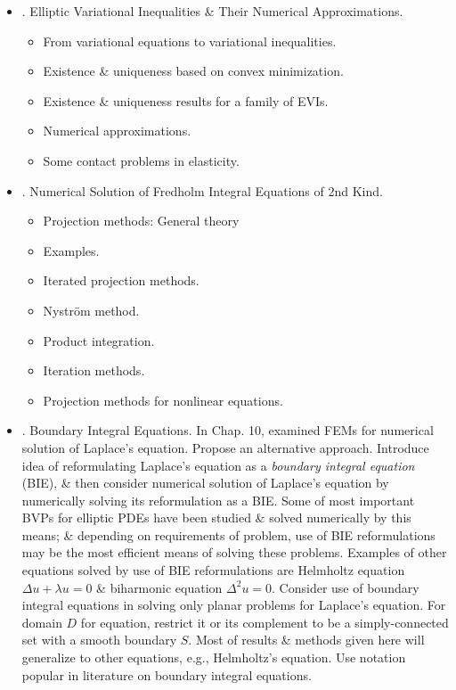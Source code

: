 \documentclass{article}
\begin{document}
\begin{enumerate}
\begin{itemize}
		\item {. Elliptic Variational Inequalities \& Their Numerical Approximations.}
		\begin{itemize}
			\item {\sf From variational equations to variational inequalities.}
			\item {\sf Existence \& uniqueness based on convex minimization.}
			\item {\sf Existence \& uniqueness results for a family of EVIs.}
			\item {\sf Numerical approximations.}
			\item {\sf Some contact problems in elasticity.}
		\end{itemize}
		\item {. Numerical Solution of Fredholm Integral Equations of 2nd Kind.}
		\begin{itemize}
			\item {\sf Projection methods: General theory}
			\item {\sf Examples.}
			\item {\sf Iterated projection methods.}
			\item {\sf Nystr\"om method.}
			\item {\sf Product integration.}
			\item {\sf Iteration methods.}
			\item {\sf Projection methods for nonlinear equations.}
		\end{itemize}
		\item {. Boundary Integral Equations.} In Chap. 10, examined FEMs for numerical solution of Laplace's equation. Propose an alternative approach. Introduce idea of reformulating Laplace's equation as a {\it boundary integral equation} (BIE), \& then consider numerical solution of Laplace's equation by numerically solving its reformulation as a BIE. Some of most important BVPs for elliptic PDEs have been studied \& solved numerically by this means; \& depending on requirements of problem, use of BIE reformulations may be the most efficient means of solving these problems. Examples of other equations solved by use of BIE reformulations are Helmholtz equation $\Delta u + \lambda u = 0$ \& biharmonic equation $\Delta^2u = 0$. Consider use of boundary integral equations in solving only planar problems for Laplace's equation. For domain $D$ for equation, restrict it or its complement to be a simply-connected set with a smooth boundary $S$. Most of results \& methods given here will generalize to other equations, e.g., Helmholtz's equation. Use notation popular in literature on boundary integral equations.

\end{itemize}
\end{enumerate}
\end{document}
